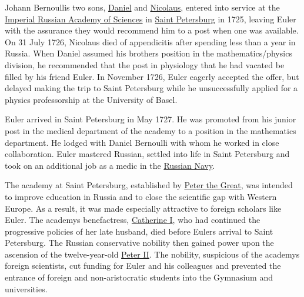 Johann Bernoulli\textquotesingle s two sons, \href{https://en.wikipedia.org/wiki/Daniel_Bernoulli}{Daniel} and \href{https://en.wikipedia.org/wiki/Nicolaus_II_Bernoulli}{Nicolaus}, entered into service at the \href{https://en.wikipedia.org/wiki/Russian_Academy_of_Sciences}{Imperial Russian Academy of Sciences} in \href{https://en.wikipedia.org/wiki/Saint_Petersburg}{Saint Petersburg} in 1725, leaving Euler with the assurance they would recommend him to a post when one was available. On 31 July 1726, Nicolaus died of appendicitis after spending less than a year in Russia. When Daniel assumed his brother\textquotesingle s position in the mathematics/physics division, he recommended that the post in physiology that he had vacated be filled by his friend Euler. In November 1726, Euler eagerly accepted the offer, but delayed making the trip to Saint Petersburg while he unsuccessfully applied for a physics professorship at the University of Basel.

Euler arrived in Saint Petersburg in May 1727. He was promoted from his junior post in the medical department of the academy to a position in the mathematics department. He lodged with Daniel Bernoulli with whom he worked in close collaboration. Euler mastered Russian, settled into life in Saint Petersburg and took on an additional job as a medic in the \href{https://en.wikipedia.org/wiki/Imperial_Russian_Navy}{Russian Navy}.

The academy at Saint Petersburg, established by \href{https://en.wikipedia.org/wiki/Peter_the_Great}{Peter the Great}, was intended to improve education in Russia and to close the scientific gap with Western Europe. As a result, it was made especially attractive to foreign scholars like Euler. The academy\textquotesingle s benefactress, \href{https://en.wikipedia.org/wiki/Catherine_I_of_Russia}{Catherine I}, who had continued the progressive policies of her late husband, died before Euler\textquotesingle s arrival to Saint Petersburg. The Russian conservative nobility then gained power upon the ascension of the twelve-year-old \href{https://en.wikipedia.org/wiki/Peter_II_of_Russia}{Peter II}. The nobility, suspicious of the academy\textquotesingle s foreign scientists, cut funding for Euler and his colleagues and prevented the entrance of foreign and non-aristocratic students into the Gymnasium and universities.

